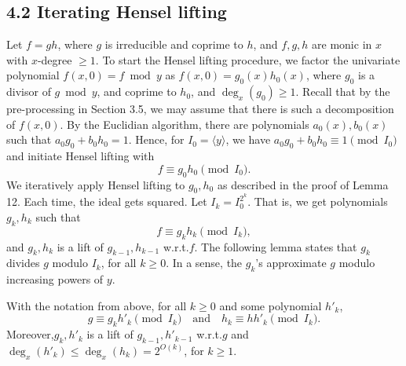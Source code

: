\subsection*{4.2 Iterating Hensel lifting}
Let $f=gh$, where $g$ is irreducible and coprime to $h$, and $f,g,h$ are monic in $x$ with $x$-degree $\geq1$.
To start the Hensel lifting procedure, we factor the univariate polynomial $f(x,0)=f\bmod y$ as $f(x,0)=g_0(x)h_0(x)$, where $g_0$ is a divisor of $g\bmod y$, and coprime to $h_0$, and $\deg_x(g_0)\geq1$. Recall that by the pre-processing in Section 3.5, we may assume that there is such a decomposition of $f(x,0)$.
By the Euclidian algorithm, there are polynomials $a_0(x),b_0(x)$ such that $a_0g_0+b_0h_0=1$. Hence, for $I_0=\langle y\rangle$, we have $a_0g_0+b_0h_0\equiv1\pmod{I_0}$ and initiate Hensel lifting with
\[f\equiv g_0h_0\pmod{I_0}.\]
We iteratively apply Hensel lifting to $g_0,h_0$ as described in the proof of Lemma 12. Each time, the ideal gets squared. Let $I_k=I_0^{2^k}$. That is, we get polynomials $g_k,h_k$ such that
\[f\equiv g_kh_k\pmod{I_k},\]
and $g_k,h_k$ is a lift of $g_{k-1},h_{k-1}$ w.r.t.$f$. The following lemma states that $g_k$ divides $g$ modulo $I_k$, for all $k\geq0$. In a sense, the $g_k$'s approximate $g$ modulo increasing powers of $y$.
\begin{ntlemma}
With the notation from above, for all $k\geq0$ and some polynomial $h'_k$,
\[g\equiv g_kh'_k\pmod{I_k}\quad\text{and}\quad h_k\equiv hh'_k\pmod{I_k}.\]
Moreover,$g_k,h'_k$ is a lift of $g_{k-1},h'_{k-1}$ w.r.t.$g$ and $\deg_x(h'_k)\leq\deg_x(h_k)=2^{O(k)}$, for $k\geq1$.
\end{ntlemma}
